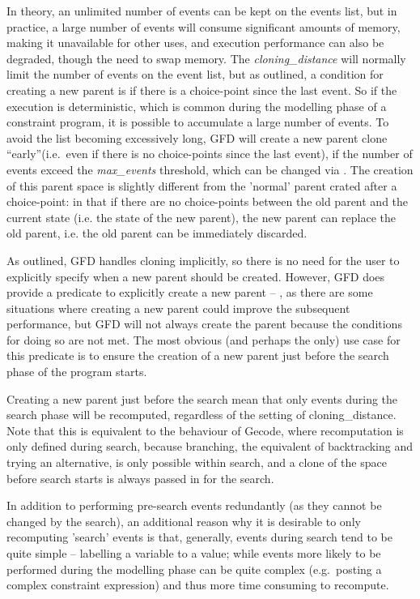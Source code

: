 In theory, an unlimited number of events can be kept on the events
 list, but in practice, a large number of events will consume
 significant amounts of memory, making it unavailable for other uses,
and execution performance can also be degraded, though the need to
 swap memory. The {\it cloning_distance\/} will normally limit the
number of events on the event list, but as outlined, a condition
for creating a new parent is if
there is a choice-point since the last event. So if the execution
 is deterministic, which is common during the modelling phase of a
constraint program, it is possible to accumulate a large number of
events. To avoid the list becoming excessively long, GFD will create a 
new parent clone
 ``early''(i.e.\ even if there is no choice-points since the last
 event), if the number of events exceed the {\it max_events\/}
 threshold, which can be changed via 
.
The creation of this parent space is slightly different from the 
'normal' parent crated after a choice-point: in that if there
are no choice-points between the old parent and the current state
(i.e. the state of the new parent), the new parent can replace the
old parent, i.e. the old parent can be immediately discarded. 

As outlined, GFD handles cloning implicitly, so there is no need for
the user to explicitly specify when a new parent should be created.
However, GFD does provide a predicate to explicitly create a new parent
-- , as there are some situations where creating a 
new parent could improve the subsequent performance, but GFD will 
not always create the parent because the conditions for doing so are
 not met. The most obvious (and perhaps the only) use case for this
predicate is to ensure the creation of a new parent just before the
search phase of the program starts.

Creating a new parent just before the search mean that only
events during the search phase will be recomputed, regardless of the
setting of cloning_distance. Note that this is equivalent to the 
behaviour of Gecode, where recomputation is only defined during
search, because branching, the equivalent of backtracking and trying an 
alternative, is only possible within search, and a clone of the space
before search starts is always passed in for the search.

In addition to performing pre-search events redundantly (as they
 cannot be changed by the search),
an additional reason why it is desirable to only recomputing 'search' events
is that, generally, events during search tend to be quite simple
 -- labelling a variable to a value; while events more likely to be
performed during
 the modelling phase can be quite complex (e.g.\ posting a complex 
constraint expression) and thus more time consuming to recompute. 

